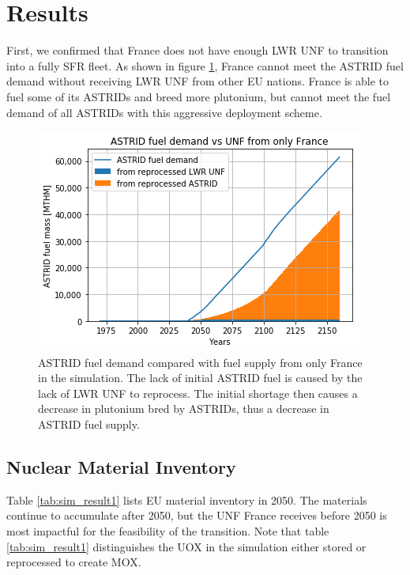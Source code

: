\section{Results}

First, we confirmed that France does not have enough
\gls{LWR} \gls{UNF} to transition into a fully \gls{SFR}
fleet. As shown in figure \ref{fig:only_france}, France
cannot meet the \gls{ASTRID} fuel demand without receiving
\gls{LWR} \gls{UNF} from other \gls{EU} nations. France
is able to fuel some of its \glspl{ASTRID} and breed more
plutonium, but cannot meet the fuel demand of 
all \glspl{ASTRID} with this aggressive deployment scheme.


\begin{figure}[htbp!]
	\begin{center}
		\includegraphics[scale=0.7]{./images/french-transition/france_only_compare.png}
	\end{center}
	\caption{\gls{ASTRID} fuel demand compared with fuel supply from only
			 France in the simulation. The lack of initial \gls{ASTRID} fuel
			 is caused by the lack of \gls{LWR} \gls{UNF} to reprocess. The
			 initial shortage then causes a decrease in plutonium bred by
			 \glspl{ASTRID}, thus a decrease in \gls{ASTRID} fuel supply.}
	\label{fig:only_france}
\end{figure}


\subsection{Nuclear Material Inventory}

Table \ref{tab:sim_result1} 
lists \gls{EU} material inventory in 2050.
The materials continue to accumulate after 2050, but the
\gls{UNF} France receives before 2050 is most impactful for the
feasibility of the transition. Note that table \ref{tab:sim_result1} 
distinguishes the
\gls{UOX} in the simulation either stored or reprocessed to create \gls{MOX}.


